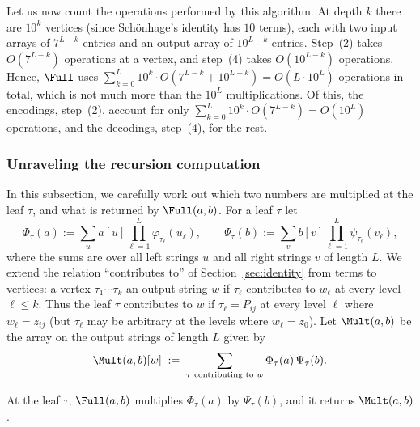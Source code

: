 Let us now count the operations performed by this algorithm. At depth $k$ there are $10^k$ vertices (since Sch\"onhage's identity has $10$ terms), each with two input arrays of $7^{L-k}$ entries and an output array of $10^{L-k}$ entries. Step~(2) takes $O(7^{L-k})$ operations at a vertex, and step~(4) takes $O(10^{L-k})$ operations. Hence, $\Full$ uses $\sum_{k=0}^{L}10^k\cdot O(7^{L-k}+10^{L-k})=O(L\cdot10^L)$ operations in total, which is not much more than the $10^L$ multiplications. Of this, the encodings, step~(2), account for only $\sum_{k=0}^{L}10^k\cdot O(7^{L-k})=O(10^L)$ operations, and the decodings, step~(4), for the rest.

\subsubsection{Unraveling the recursion computation}\label{sec:whatit}

In this subsection, we carefully work out which two numbers are multiplied at the leaf $\tau$, and what is returned by $\Full(a,b)$. For a leaf $\tau$ let
\[
\Phi_\tau(a):=\sum_u a[u]\prod_{\ell=1}^{L}\varphi_{\tau_\ell}(u_\ell),\qquad
\Psi_\tau(b):=\sum_v b[v]\prod_{\ell=1}^{L}\psi_{\tau_\ell}(v_\ell),
\]
where the sums are over all left strings $u$ and all right strings $v$ of length $L$. We extend the relation ``contributes to'' of Section~\ref{sec:identity} from terms to vertices: a vertex $\tau_1\cdots\tau_k$  an output string $w$ if $\tau_\ell$ contributes to $w_\ell$ at every level $\ell\le k$. Thus the leaf $\tau$ contributes to $w$ if $\tau_\ell=P_{ij}$ at every level $\ell$ where $w_\ell = z_{ij}$ (but $\tau_\ell$ may be arbitrary at the levels where $w_\ell = z_0$). Let $\Mult(a,b)$ be the array on the output strings of length $L$ given by
\begin{equation}\label{eq:multdef}
\Mult(a,b)[w]\;:=\;\sum_{\tau\text{ contributing to }w}\Phi_\tau(a)\,\Psi_\tau(b).
\end{equation}

\begin{lemma}\label{lem:recursion}
At the leaf $\tau$, $\Full(a,b)$ multiplies $\Phi_\tau(a)$ by $\Psi_\tau(b)$, and it returns $\Mult(a,b)$.
\end{lemma}

